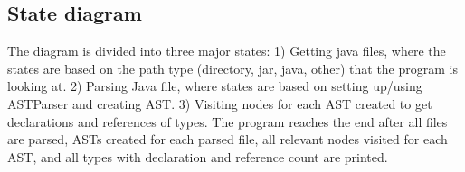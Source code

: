 \documentclass[12p]{article}
\begin{document}
\subsection{State diagram}
The diagram is divided into three major states: 1) Getting java files, where the states are based on the path type (directory, jar, java, other) that the program is looking at. 2) Parsing Java file, where states are based on setting up/using ASTParser and creating AST. 3) Visiting nodes for each AST created to get declarations and references of types. The program reaches the end after all files are parsed, ASTs created for each parsed file, all relevant nodes visited for each AST, and all types with declaration and reference count are printed.
\end{document}
